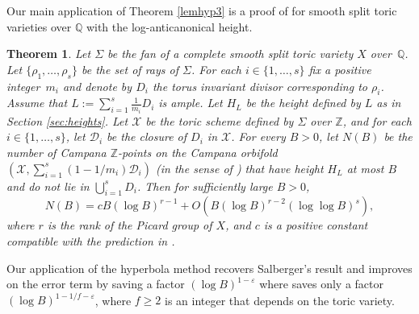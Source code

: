 \documentclass[JEP,XML,SOM,Unicode,published]{cedram}
\newcommand\ZZ{\mathbb{Z}}
\newcommand\QQ{\mathbb{Q}}
\newtheorem{theorem}{Theorem}
\theoremstyle{definition}
\numberwithin{theorem}{section}
\begin{document}
Our main application of Theorem \ref{lemhyp3} is a proof of \cite[Conj.\,1.1]{PSTVA} for smooth split toric varieties over $\QQ$ with the log-anticanonical height.
\begin{theorem}
\label{thm:toric}
Let $\Sigma$ be the fan of a complete smooth split toric variety $X$ over~$\QQ$. Let $\{\rho_1,\dots,\rho_s\}$ be the set of rays of $\Sigma$.
For each $i\in\{1,\dots,s\}$ fix a positive integer~$m_i$
and denote by $D_i$ the torus invariant divisor corresponding to $\rho_i$. Assume that $L:=\sum_{i=1}^s\frac 1{m_i} D_i$ is ample.
Let $H_L$ be the height defined by $L$ as in Section \ref{sec:heights}.
Let $\mathscr X$ be the toric scheme defined by $\Sigma$ over $\ZZ$, and for each $i\in\{1,\dots,s\}$, let $\mathscr D_i$ be the closure of $D_i$ in $\mathscr X$.
For every $B>0$, let $N(B)$ be the number of Campana $\ZZ$-points on the Campana orbifold $(\mathscr X, \sum_{i=1}^s(1-1/m_i)\mathscr D_i)$ (in the sense of \cite[Def.\,3.4]{PSTVA}) that have height $H_L$ at most $B$ and do not lie in $\bigcup_{i=1}^sD_i$.
Then for sufficiently large $B>0$,
\begin{equation}
\label{eq:mainthm_asympt}
N(B) = c B(\log B)^{r-1} + O(
B(\log B)^{r-2}(\log\log B)^{s}),
\end{equation}
where $r$ is the rank of the Picard group of $X$, and $c$ is a positive constant compatible with the prediction in \cite[\S3.3]{PSTVA}.
\end{theorem}
Our application of the hyperbola method recovers Salberger's result \cite{MR1679841} and improves on the error term by saving a factor $(\log B)^{1-\varepsilon}$ where \cite{MR1679841} saves only a factor $(\log B)^{1-1/f-\varepsilon}$, where $f\geq 2$ is an integer that depends on the toric variety.
\end{document}
